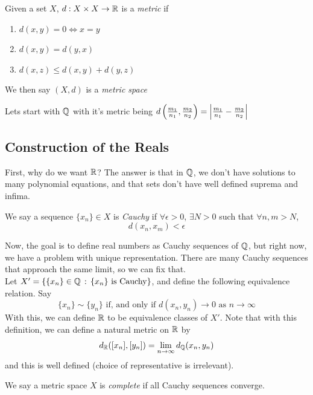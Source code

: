 
\begin{definition}
    Given a set $X$, $d : X \times X \to \mathbb{R}$ is a \emph{metric} if
    \begin{enumerate}
        \item $d(x, y) = 0 \iff x = y$
        \item $d(x, y) = d(y, x)$
        \item $d(x, z) \leq d(x, y) + d(y, z)$
    \end{enumerate}
    We then say $(X, d)$ is a \emph{metric space} 
\end{definition}

Lets start with $\mathbb{Q}$ with it's metric being $d\left(\frac{m_1}{n_1}, \frac{m_2}{n_2}\right) = \left\lvert {\frac{m_1}{n_1} - \frac{m_2}{n_2}} \right\rvert$

\subsection*{Construction of the Reals}

First, why do we want $\mathbb{R}$? The answer is that in $\mathbb{Q}$, we don't have solutions to many polynomial equations, and that sets don't have well defined suprema and infima. 

\begin{definition}
	We say a sequence $\{x_n\} \in X$ is \emph{Cauchy} if $\forall \epsilon > 0$, $\exists N > 0$ such that $\forall n, m > N$,
	\[ d(x_n, x_m) < \epsilon \]
\end{definition}
Now, the goal is to define real numbers as Cauchy sequences of $\mathbb{Q}$, but right now, we have a problem with unique representation. There are many Cauchy sequences that approach the same limit, so we can fix that.\\

Let $X' = \{\{x_n\} \in \mathbb{Q} \, :\, \{x_n\} \text{ is Cauchy}\}$, and define the following equivalence relation. Say
\[ \{x_n\} \sim \{y_n\} \text{ if, and only if } d(x_n, y_n) \to 0 \text{ as } n \to \infty \]
With this, we can define $\mathbb{R}$ to be equivalence classes of $X'$. Note that with this definition, we can define a natural metric on $\mathbb{R}$ by
\[ d_{\mathbb{R}}([x_n], [y_n]) = \lim_{n \to \infty} d_{\mathbb{Q}}(x_n, y_n) \]
and this is well defined (choice of representative is irrelevant). 

\begin{definition}
	We say a metric space $X$ is \emph{complete} if all Cauchy sequences converge.
\end{definition}

